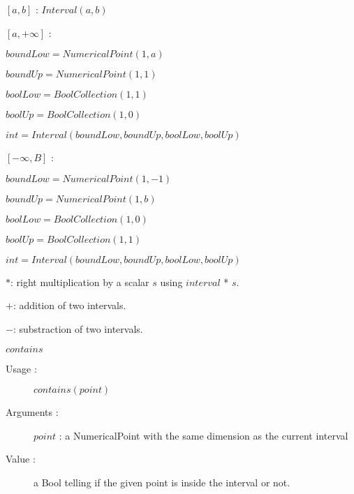 \begin{description}
\item[Some Examples :] \rule{0pt}{1em}

  \begin{description}

  \item $[a,b]$ : $Interval(a,b)$

  \item $[a,+\infty]$ :
    \begin{description}
    \item $boundLow=NumericalPoint(1,a)$
    \item $boundUp=NumericalPoint(1,1)$
    \item $boolLow = BoolCollection(1,1)$
    \item $boolUp = BoolCollection(1,0)$
    \item $int = Interval(boundLow,boundUp,boolLow,boolUp)$
    \end{description}


  \item $[-\infty, B]$ :
    \begin{description}
    \item $boundLow=NumericalPoint(1,-1)$
    \item $boundUp=NumericalPoint(1,b)$
    \item $boolLow = BoolCollection(1,0)$
    \item $boolUp = BoolCollection(1,1)$
    \item $int = Interval(boundLow,boundUp,boolLow,boolUp)$
    \end{description}

  \end{description}

\item[Some methods :]  \rule{0pt}{1em}

  \begin{description}

  \item $*$: right multiplication by a scalar $s$ using $interval$ * $s$.

  \item $+$: addition of two intervals.
  \item $-$: substraction of two intervals.

  \item $contains$
    \begin{description}
    \item[Usage :] $contains(point)$
    \item[Arguments :] $point$ : a NumericalPoint with the same dimension as the current interval
    \item[Value :] a Bool telling if the given point is inside the interval or not.
    \end{description}
    \bigskip


\end{description}
\end{description}

